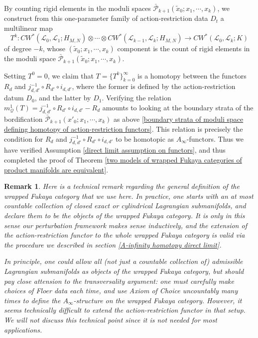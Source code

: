 \documentclass{amsart}
\newtheorem{remark}[theorem]{Remark}
\numberwithin{equation}{section}
\numberwithin{figure}{section}
\begin{document}
	By counting rigid elements in the moduli spaces $\bar{\mathcal{P}}_{k+1}(\tilde{x}_{0}; x_{1}, \cdots, x_{k})$, we construct from this one-parameter family of action-restriction data $D_{t}$ a multilinear map
\begin{equation}
T^{k}: CW^{*}(\mathcal{L}_{0}, \mathcal{L}_{1}; H_{M, N}) \otimes \cdots \otimes CW^{*}(\mathcal{L}_{k-1}, \mathcal{L}_{k}; H_{M, N}) \to CW^{*}(\mathcal{L}_{0}, \mathcal{L}_{k}; K)
\end{equation}
of degree $-k$, whose $(\tilde{x}_{0}; x_{1}, \cdots, x_{k})$ component is the count of rigid elements in the moduli space $\bar{\mathcal{P}}_{k+1}(\tilde{x}_{0}; x_{1}, \cdots, x_{k})$. \par
	Setting $T^{0} = 0$, we claim that $T = \{T^{k}\}_{k=0}^{\infty}$ is a homotopy between the functors $R_{d}$ and $j_{d, d'}^{-1} \circ R_{d'} \circ i_{d, d'}$, where the former is defined by the action-restriction datum $D_{0}$, and the latter by $D_{1}$. Verifying the relation $m^{1}_{\mathcal{Q}}(T) = j_{d, d'}^{-1} \circ R_{d'} \circ i_{d, d'} - R_{d}$ amounts to looking at the boundary strata of the bordification $\bar{\mathcal{P}}_{k+1}(x'_{0}; x_{1}, \cdots, x_{k})$ as above \eqref{boundary strata of moduli space defining homotopy of action-restriction functors}. This relation is precisely the condition for $R_{d}$ and $j_{d, d'}^{-1} \circ R_{d'} \circ i_{d, d'}$ to be homotopic as $A_{\infty}$-functors. Thus we have verified Assumption \ref{direct limit assumption on functors}, and thus completed the proof of Theorem \ref{two models of wrapped Fukaya categories of product manifolds are equivalent}. \par

\begin{remark}
	Here is a technical remark regarding the general definition of the wrapped Fukaya category that we use here. In practice, one starts with an at most countable collection of closed exact or cylindrical Lagrangian submanifolds, and declare them to be the objects of the wrapped Fukaya category. It is only in this sense our perturbation framework makes sense inductively, and the extension of the action-restriction functor to the whole wrapped Fukaya category is valid via the procedure we described in section \ref{A-infinity homotopy direct limit}. \par
	In principle, one could allow all (not just a countable collection of) admissible Lagrangian submanifolds as objects of the wrapped Fukaya category, but should pay close attension to the transversality argument: one must carefully make choices of Floer data each time, and use Axiom of Choice uncountably many times to define the $A_{\infty}$-structure on the wrapped Fukaya category. However, it seems technically difficult to extend the action-restriction functor in that setup. We will not discuss this technical point since it is not needed for most applications. \par
\end{remark}
\end{document}
